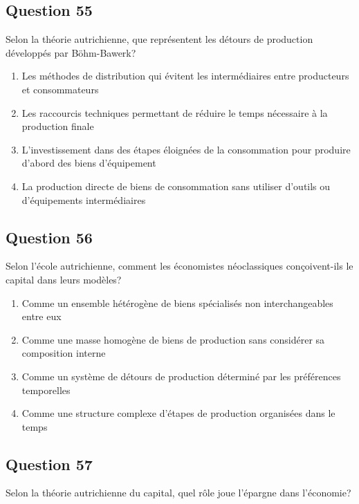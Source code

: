 \documentclass[12pt,a4paper]{article}
\begin{document}
\bigskip


\subsection*{Question 55}
Selon la théorie autrichienne, que représentent les détours de production développés par Böhm-Bawerk?

\begin{enumerate}[label=\Alph*., leftmargin=*]
\item Les méthodes de distribution qui évitent les intermédiaires entre producteurs et consommateurs
\item Les raccourcis techniques permettant de réduire le temps nécessaire à la production finale
\item L'investissement dans des étapes éloignées de la consommation pour produire d'abord des biens d'équipement
\item La production directe de biens de consommation sans utiliser d'outils ou d'équipements intermédiaires
\end{enumerate}

\bigskip


\subsection*{Question 56}
Selon l'école autrichienne, comment les économistes néoclassiques conçoivent-ils le capital dans leurs modèles?

\begin{enumerate}[label=\Alph*., leftmargin=*]
\item Comme un ensemble hétérogène de biens spécialisés non interchangeables entre eux
\item Comme une masse homogène de biens de production sans considérer sa composition interne
\item Comme un système de détours de production déterminé par les préférences temporelles
\item Comme une structure complexe d'étapes de production organisées dans le temps
\end{enumerate}

\bigskip


\subsection*{Question 57}
Selon la théorie autrichienne du capital, quel rôle joue l'épargne dans l'économie?
\end{document}
